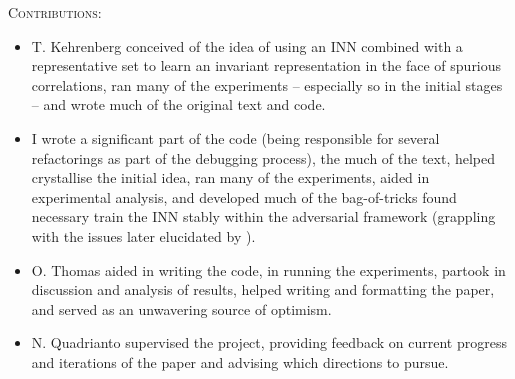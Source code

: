 \noindent\textsc{Contributions:}
%
\begin{itemize}
    \item 
        T. Kehrenberg conceived of the idea of using an \acf{INN} combined with a representative
        set to learn an invariant representation in the face of spurious correlations, ran many of
        the experiments -- especially so in the initial stages -- and wrote much of the original
        text and code.
    \item 
        I wrote a significant part of the code (being responsible for several refactorings as part
        of the debugging process), the much of the text, helped crystallise the initial idea, ran
        many of the experiments, aided in experimental analysis, and developed much of the
        bag-of-tricks found necessary train the \ac{INN} stably within the adversarial framework
        (grappling with the issues later elucidated by \cite{behrmann2021understanding}).
    \item 
        O. Thomas aided in writing the code, in running the experiments, partook in discussion and
        analysis of results, helped writing and formatting the paper, and served as an unwavering
        source of optimism.
    \item
        N. Quadrianto supervised the project, providing feedback on current progress and iterations
        of the paper and advising which directions to pursue.
\end{itemize}
